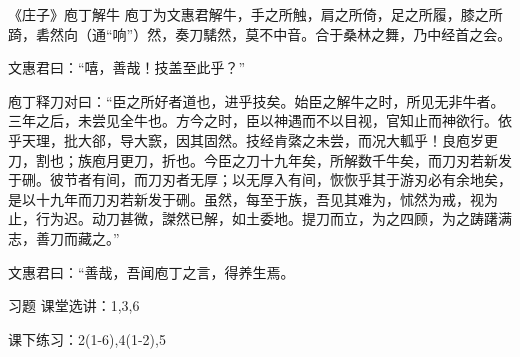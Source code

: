 \documentclass[11pt]{beamer}
\newcommand{\kong}[1][0.5]{\vspace{#1cm}}
\begin{document}
\begin{frame}{《庄子》庖丁解牛}
庖丁为文惠君解牛，手之所触，肩之所倚，足之所履，膝之所踦，砉然向（通“响”）然，奏刀騞然，莫不中音。合于桑林之舞，乃中经首之会。

文惠君曰：“嘻，善哉！技盖至此乎？”

庖丁释刀对曰：“臣之所好者道也，进乎技矣。始臣之解牛之时，所见无非牛者。三年之后，未尝见全牛也。方今之时，臣以神遇而不以目视，官知止而神欲行。依乎天理，批大郤，导大窾，因其固然。技经肯綮之未尝，而况大軱乎！良庖岁更刀，割也；族庖月更刀，折也。今臣之刀十九年矣，所解数千牛矣，而刀刃若新发于硎。彼节者有间，而刀刃者无厚；以无厚入有间，恢恢乎其于游刃必有余地矣，是以十九年而刀刃若新发于硎。虽然，每至于族，吾见其难为，怵然为戒，视为止，行为迟。动刀甚微，謋然已解，如土委地。提刀而立，为之四顾，为之踌躇满志，善刀而藏之。”

文惠君曰：“善哉，吾闻庖丁之言，得养生焉。
\end{frame}

\begin{frame}{习题}
\kong[0.5]
课堂选讲：1,3,6

\kong[1]
课下练习：2(1-6),4(1-2),5
\end{frame}
\end{document}
